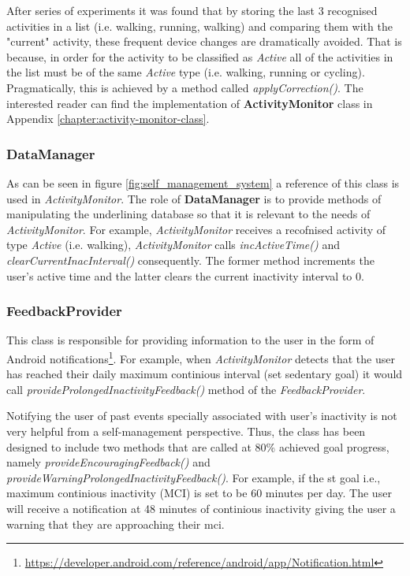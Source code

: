     After series of experiments it was found that by storing the last 3 recognised activities in a list (i.e. walking, running, walking) and comparing them with the "current" activity, these frequent device changes are dramatically avoided. That is because, in order for the activity to be classified as \textit{Active} all of the activities in the list must be of the same \textit{Active} type (i.e. walking, running or cycling). Pragmatically, this is achieved by a method called \textit{applyCorrection()}. The interested reader can find the implementation of \textbf{ActivityMonitor} class in Appendix \ref{chapter:activity-monitor-class}.
    
    \subsubsection{DataManager}
    As can be seen in figure \ref{fig:self_management_system} a reference of this class is used in \textit{ActivityMonitor}. The role of \textbf{DataManager} is to provide methods of manipulating the underlining database so that it is relevant to the needs of \textit{ActivityMonitor}. For example, \textit{ActivityMonitor} receives a recofnised activity of type \textit{Active} (i.e. walking), \textit{ActivityMonitor} calls \textit{incActiveTime()} and \textit{clearCurrentInacInterval()} consequently. The former method increments the user's active time and the latter clears the current inactivity interval to 0.
    
    \subsubsection{FeedbackProvider}
    \label{section:feedback-provider}
    This class is responsible for providing information to the user in the form of Android notifications\footnote{\url{https://developer.android.com/reference/android/app/Notification.html}}. For example, when \textit{ActivityMonitor} detects that the user has reached their daily maximum continious interval (set sedentary goal) it would call \textit{provideProlongedInactivityFeedback()} method of the \textit{FeedbackProvider}.
    
    Notifying the user of past events specially associated with user's inactivity is not very helpful from a self-management perspective. Thus, the class has been designed to include two methods that are called at 80\% achieved goal progress, namely \textit{provideEncouragingFeedback()} and \textit{provideWarningProlongedInactivityFeedback()}. For example, if the \gls{st} goal i.e., maximum continious inactivity (MCI) is set to be 60 minutes per day. The user will receive a notification at 48 minutes of continious inactivity giving the user a warning that they are approaching their \gls{mci}. 

